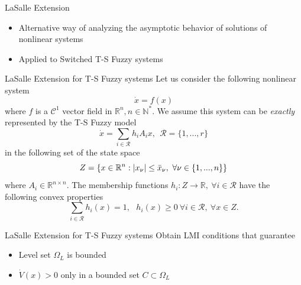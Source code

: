 \begin{frame}{LaSalle Extension}
\begin{itemize}
    \item Alternative way of analyzing the asymptotic behavior of solutions of nonlinear systems
    \item Applied to Switched T-S Fuzzy systems \autocite{Valentino2019}
\end{itemize}
\end{frame}

\begin{frame}{LaSalle Extension for T-S Fuzzy systems}
Let us consider the following nonlinear system
\begin{equation}
    \dot{x} = f(x)
\end{equation}
where $f$ is a $\mathcal{C}^1$ vector field in $\mathbb{R}^n,  n \in \mathbb{N}^*$. We assume this system can be \textit{exactly} represented by the T-S Fuzzy model \autocite{Taniguchi2001a} 
\begin{equation} \label{fuzzysys}
    \dot{x} = \sum_{i \in \mathcal{R}}h_iA_ix, ~~\mathcal{R} = \{1,...,r\}
\end{equation}
in the following set of the state space
\begin{equation} \label{eq:z}
    Z = \{x \in \mathbb{R}^n : |x_{\nu}| \leq \Bar{x}_{\nu}, ~~\forall \nu \in \{1,...,n\} \}
\end{equation}
where $A_i \in \mathbb{R}^{n\times n}$. The membership functions $h_i:Z \longrightarrow \mathbb{R}, ~\forall i \in \mathcal{R}$ have the following convex properties
\begin{equation}
    \sum_{i \in \mathcal{R}}h_i(x) = 1, ~~~h_i(x) \geq 0 ~\forall i \in \mathcal{R}, ~\forall x \in Z.
\end{equation}
\end{frame}

\begin{frame}{LaSalle Extension for T-S Fuzzy systems}
    Obtain LMI conditions that guarantee
\begin{itemize}
    \item Level set $\Omega_L$ is bounded
    \item $\dot{V}(x) > 0$ only in a bounded set $C \subset \Omega_L$
\end{itemize}
\end{frame}


